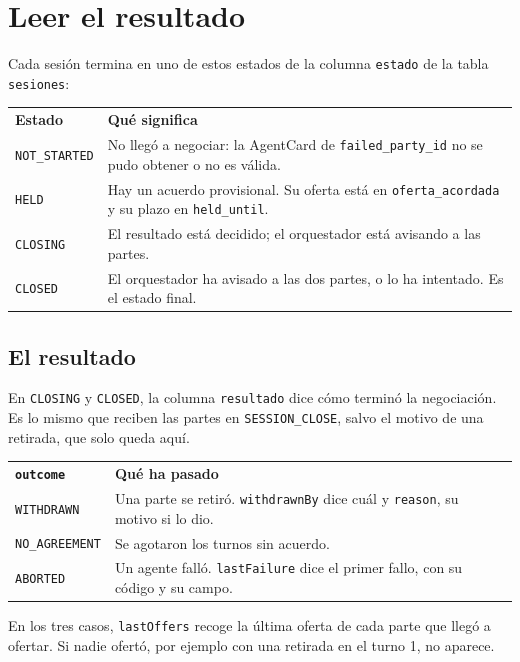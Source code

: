 \chapter{Leer el resultado}

Cada sesión termina en uno de estos estados de la columna \texttt{estado} de la tabla \texttt{sesiones}:

\begin{tabular}{lp{10cm}}
  \textbf{Estado} & \textbf{Qué significa} \\
  \texttt{NOT\_STARTED} & No llegó a negociar: la AgentCard de \texttt{failed\_party\_id} no se pudo obtener o no es válida. \\
  \texttt{HELD} & Hay un acuerdo provisional. Su oferta está en \texttt{oferta\_acordada} y su plazo en \texttt{held\_until}. \\
  \texttt{CLOSING} & El resultado está decidido; el orquestador está avisando a las partes. \\
  \texttt{CLOSED} & El orquestador ha avisado a las dos partes, o lo ha intentado. Es el estado final. \\
\end{tabular}

\section{El resultado}

En \texttt{CLOSING} y \texttt{CLOSED}, la columna \texttt{resultado} dice cómo terminó la negociación. Es lo mismo que reciben las partes en \texttt{SESSION\_CLOSE}, salvo el motivo de una retirada, que solo queda aquí.

\begin{tabular}{lp{9.5cm}}
  \textbf{\texttt{outcome}} & \textbf{Qué ha pasado} \\
  \texttt{WITHDRAWN} & Una parte se retiró. \texttt{withdrawnBy} dice cuál y \texttt{reason}, su motivo si lo dio. \\
  \texttt{NO\_AGREEMENT} & Se agotaron los turnos sin acuerdo. \\
  \texttt{ABORTED} & Un agente falló. \texttt{lastFailure} dice el primer fallo, con su código y su campo. \\
\end{tabular}

En los tres casos, \texttt{lastOffers} recoge la última oferta de cada parte que llegó a ofertar. Si nadie ofertó, por ejemplo con una retirada en el turno 1, no aparece.

